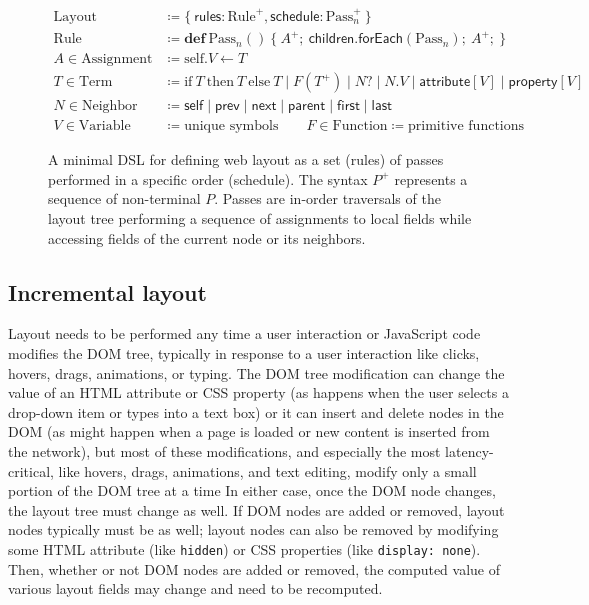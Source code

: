 \begin{figure}

\begin{align*}
\text{Layout} &\coloneq  \{\:
  \mathsf{rules}: \text{Rule}^+,
  \mathsf{schedule}: \text{Pass}_n^+
\:\} \\
\text{Rule} &\coloneq
  \mathbf{def}\:\text{Pass}_n()\:\{\:
    A^+;\:
    \mathsf{children}.\mathsf{forEach}(\text{Pass}_n);\:
    A^+;\:
  \} \\
A \in \text{Assignment} &\coloneq
  \text{self}.V \leftarrow T \\[4pt]
T \in \text{Term} &\coloneq
  \text{if}\ T\ \text{then}\ T\ \text{else}\ T \mid
  F(T^+) \mid
  N? \mid
  N.V \mid
  \mathsf{attribute}[V] \mid
  \mathsf{property}[V] \\
N \in \text{Neighbor} &\coloneq
  \mathsf{self} \mid \mathsf{prev} \mid
  \mathsf{next} \mid \mathsf{parent} \mid
  \mathsf{first} \mid \mathsf{last} \\[4pt]
V \in \text{Variable} &\coloneq \text{unique symbols} \quad\quad
F \in \text{Function} \coloneq \text{primitive functions}
\end{align*}
\caption{
  A minimal DSL for defining web layout
    as a set (\textsf{rules}) of passes
    performed in a specific order (\textsf{schedule}).
  The syntax $P^+$ represents a sequence of non-terminal $P$.
  Passes are in-order traversals of the layout tree
    performing a sequence of assignments to local fields
    while accessing fields of the current node or its neighbors.
}
\label{fig:dsl}
\end{figure}


\subsection{Incremental layout}

Layout needs to be performed any time
  a user interaction or JavaScript code
  modifies the DOM tree,
  typically in response to a user interaction like
  clicks, hovers, drags, animations, or typing.
The DOM tree modification
  can change the value of an HTML attribute or CSS property
  (as happens when the user selects a drop-down item
  or types into a text box)
  or it can insert and delete nodes in the DOM
  (as might happen when a page is loaded or new content
  is inserted from the network),
  but most of these modifications,
  and especially the most latency-critical,
  like hovers, drags, animations, and text editing,
  modify only a small portion of the DOM tree at a time
In either case,
  once the DOM node changes,
  the layout tree must change as well.
If DOM nodes are added or removed,
  layout nodes typically must be as well;
  layout nodes can also be removed
  by modifying some HTML attribute (like \texttt{hidden})
  or CSS properties (like \texttt{display: none}).
Then, whether or not DOM nodes are added or removed,
  the computed value of various layout fields
  may change and need to be recomputed.

